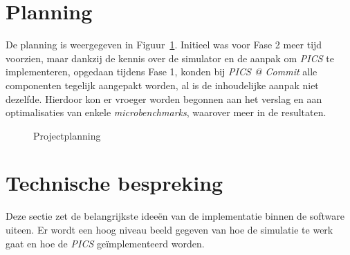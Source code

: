 \documentclass[12pt,a4paper,faculty=ea,language=nl]{ugent-doc}
\begin{document}
\section{Planning}
De planning is weergegeven in Figuur~\ref{fig:planning}. Initieel was voor Fase 2 meer tijd voorzien, maar dankzij de kennis over de simulator en de aanpak om \textit{PICS} te implementeren, opgedaan tijdens Fase 1, konden bij \textit{PICS @ Commit} alle componenten tegelijk aangepakt worden, al is de inhoudelijke aanpak niet dezelfde. Hierdoor kon er vroeger worden begonnen aan het verslag en aan optimalisaties van enkele \textit{microbenchmarks}, waarover meer in de resultaten.
\begin{figure}[H]
    \centering
    \caption{Projectplanning}
    \label{fig:planning}
\end{figure}

\section{Technische bespreking}
Deze sectie zet de belangrijkste ideeën van de implementatie binnen de software uiteen. Er wordt een hoog niveau beeld gegeven van hoe de simulatie te werk gaat en hoe de \textit{PICS} geïmplementeerd worden.
\end{document}

